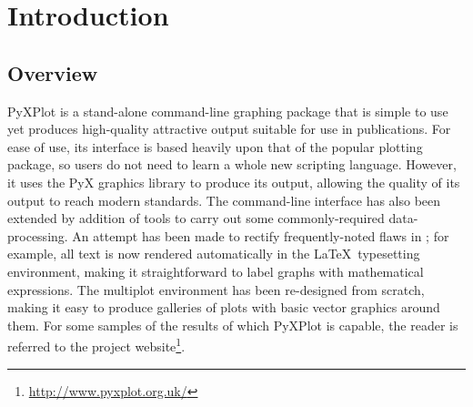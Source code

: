 %
%
%
%
%



\chapter{Introduction} 

\label{introduction}

\section{Overview}

{\sc PyXPlot} is a stand-alone command-line graphing package that is simple to
use yet produces high-quality attractive output suitable for use in
publications. For ease of use, its interface is based heavily upon that of the
popular {\sc \gnuplot} plotting package, so users do not need to
learn a whole new scripting language. However, it uses the PyX graphics library
to produce its output, allowing the quality of its output to reach modern
standards.  The command-line interface has also been extended by addition of
tools to carry out some commonly-required data-processing.  An attempt has been
made to rectify frequently-noted flaws in \gnuplot; for example, all text is
now rendered automatically in the \LaTeX\ typesetting environment, making it
straightforward to label graphs with mathematical expressions. The multiplot
environment has been re-designed from scratch, making it easy to produce
galleries of plots with basic vector graphics around them.  For some samples of
the results of which PyXPlot is capable, the reader is referred to the project
website\footnote{\url{http://www.pyxplot.org.uk/}}.

